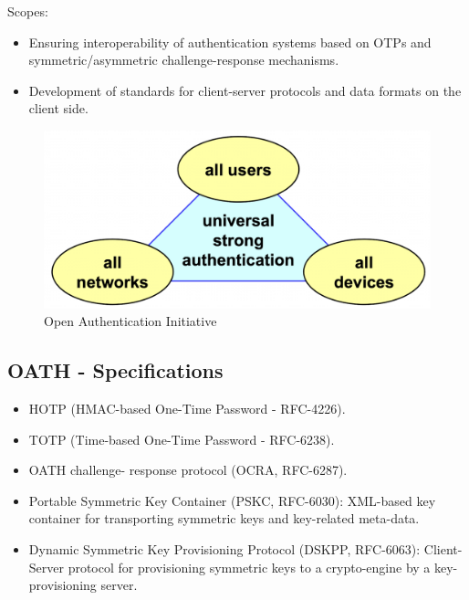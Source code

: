 \begin{multicols}{2}

    Scopes:
    \begin{itemize}
        \item Ensuring interoperability of authentication systems based on OTPs and symmetric/asymmetric challenge-response mechanisms.  
        \item Development of standards for client-server protocols and data formats on the client side.
    \end{itemize}
\columnbreak

\begin{figure}[H]
    \centering
    \includegraphics[width=\linewidth]{Images/Authentication/oath.png}
    \caption{Open Authentication Initiative}
\end{figure}

\end{multicols}

\subsection*{OATH - Specifications}
\begin{itemize}
    \item HOTP (HMAC-based One-Time Password - RFC-4226).
    \item TOTP (Time-based One-Time Password - RFC-6238).
    \item OATH challenge- response protocol (OCRA, RFC-6287).
    \item Portable Symmetric Key Container (PSKC, RFC-6030): XML-based key container for transporting symmetric keys and key-related meta-data.
    \item Dynamic Symmetric Key Provisioning Protocol (DSKPP, RFC-6063): Client-Server protocol for provisioning symmetric keys to a crypto-engine by a key-provisioning server.
\end{itemize}

